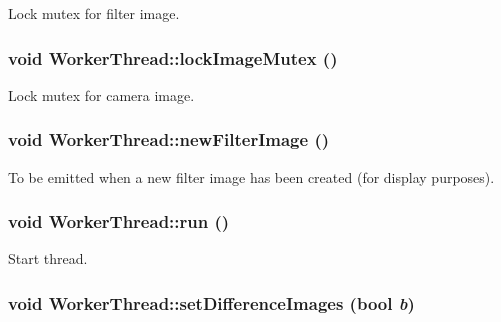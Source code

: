 Lock mutex for filter image. \hypertarget{classWorkerThread_bed6b78d6e49140a85c80613aa58625e}{
\subsubsection[{lockImageMutex}]{\setlength{\rightskip}{0pt plus 5cm}void WorkerThread::lockImageMutex ()}}
\label{classWorkerThread_bed6b78d6e49140a85c80613aa58625e}


Lock mutex for camera image. \hypertarget{classWorkerThread_beca512642668fb06773f60abc56ca32}{
\subsubsection[{newFilterImage}]{\setlength{\rightskip}{0pt plus 5cm}void WorkerThread::newFilterImage ()}}
\label{classWorkerThread_beca512642668fb06773f60abc56ca32}


To be emitted when a new filter image has been created (for display purposes). \hypertarget{classWorkerThread_b1b55d37c2317d8799cd65ee864f7d8b}{
\subsubsection[{run}]{\setlength{\rightskip}{0pt plus 5cm}void WorkerThread::run ()}}
\label{classWorkerThread_b1b55d37c2317d8799cd65ee864f7d8b}


Start thread. \hypertarget{classWorkerThread_123b802c534d8e624f49cac6a94933d7}{
\subsubsection[{setDifferenceImages}]{\setlength{\rightskip}{0pt plus 5cm}void WorkerThread::setDifferenceImages (bool {\em b})}}
\label{classWorkerThread_123b802c534d8e624f49cac6a94933d7}


